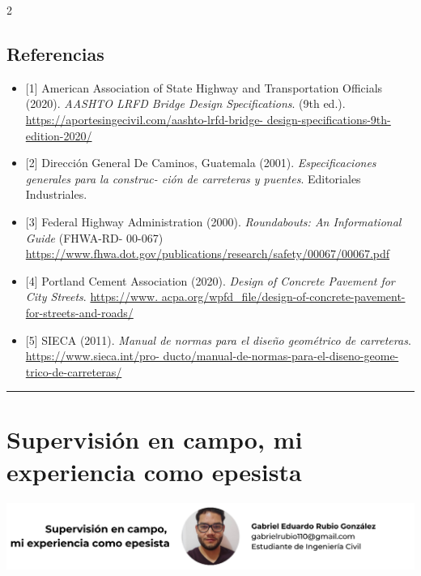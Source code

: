 \documentclass[12pt,spanish,Letterpaper,openany]{book}
\newcommand{\HRule}{\begin{center}\rule{0.5\linewidth}{0.2mm}\end{center}}
\begin{document}
\begin {multicols}{2}
\hypertarget{referencias-2}{%
\section{Referencias}\label{referencias-2}}

\begin{itemize}
\item
  {[}1{]} American Association of State Highway and Transportation Officials (2020). \emph{AASHTO LRFD Bridge Design Specifications}. (9th ed.). \href{https://aportesingecivil.com/aashto-lrfd-bridge-design-specifications-9th-edition-2020/}{https://aportesingecivil.com/aashto-lrfd-bridge-
  design-specifications-9th-edition-2020/}
\item
  {[}2{]} Dirección General De Caminos, Guatemala (2001). \emph{Especificaciones generales para la construc-
  ción de carreteras y puentes}. Editoriales Industriales.
\item
  {[}3{]} Federal Highway Administration (2000). \emph{Roundabouts: An Informational Guide} (FHWA-RD-
  00-067) \url{https://www.fhwa.dot.gov/publications/research/safety/00067/00067.pdf}
\item
  {[}4{]} Portland Cement Association (2020). \emph{Design of Concrete Pavement for City Streets}. \href{https://www.acpa.org/wpfd_file/design-of-concrete-pavement-for-streets-and-roads/}{https://www.
  acpa.org/wpfd\_file/design-of-concrete-pavement-
  for-streets-and-roads/}
\item
  {[}5{]} SIECA (2011). \emph{Manual de normas para el diseño geométrico de carreteras}. \href{https://www.sieca.int/producto/manual-de-normas-para-el-diseno-geometrico-de-carreteras/}{https://www.sieca.int/pro-
  ducto/manual-de-normas-para-el-diseno-geome-
  trico-de-carreteras/}
\end{itemize}

\end {multicols}

\medskip

\HRule

\medskip

\hypertarget{art04}{%
\chapter{Supervisión en campo, mi experiencia como epesista}\label{art04}}

\begin{center}\includegraphics[width=1\linewidth]{autores/art04} \end{center}
\end{document}
